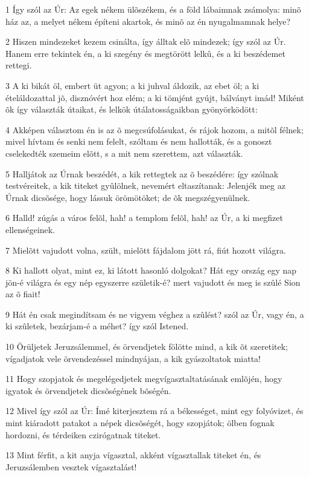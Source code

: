 \par 1 Így szól az Úr: Az egek nékem ülõszékem, és a föld lábaimnak zsámolya: minõ ház az, a melyet nékem építeni akartok, és minõ az én nyugalmamnak helye?
\par 2 Hiszen mindezeket kezem csinálta, így álltak elõ mindezek; így szól az Úr. Hanem erre tekintek én, a ki szegény és megtörött lelkû, és a ki beszédemet rettegi.
\par 3 A ki bikát öl, embert üt agyon; a ki juhval áldozik, az ebet öl; a ki ételáldozattal jõ, disznóvért hoz elém; a ki tömjént gyújt, bálványt imád! Miként õk így választák útaikat, és lelkök útálatosságaikban gyönyörködött:
\par 4 Akképen választom én is az õ megcsúfolásukat, és rájok hozom, a mitõl félnek; mivel hívtam és senki nem felelt, szóltam és nem hallották, és a gonoszt cselekedték szemeim elõtt, s a mit nem szerettem, azt választák.
\par 5 Halljátok az Úrnak beszédét, a kik rettegtek az õ beszédére: így szólnak testvéreitek, a kik titeket gyûlölnek, nevemért eltaszítanak: Jelenjék meg az Úrnak dicsõsége, hogy lássuk örömötöket; de õk megszégyenülnek.
\par 6 Halld! zúgás a város felõl, hah! a templom felõl, hah! az Úr, a ki megfizet ellenségeinek.
\par 7 Mielõtt vajudott volna, szült, mielõtt fájdalom jött rá, fiút hozott világra.
\par 8 Ki hallott olyat, mint ez, ki látott hasonló dolgokat? Hát egy ország egy nap jön-é világra és egy nép egyszerre születik-é? mert vajudott és meg is szûlé Sion az õ fiait!
\par 9 Hát én csak megindítsam és ne vigyem véghez a szûlést? szól az Úr, vagy én, a ki szûletek, bezárjam-é a méhet? így szól Istened.
\par 10 Örüljetek Jeruzsálemmel, és örvendjetek fölötte mind, a kik õt szeretitek; vígadjatok vele örvendezéssel mindnyájan, a kik gyászoltatok miatta!
\par 11 Hogy szopjatok és megelégedjetek megvígasztaltatásának emlõjén, hogy igyatok és örvendjetek dicsõségének bõségén.
\par 12 Mivel így szól az Úr: Ímé kiterjesztem rá a békességet, mint egy folyóvizet, és mint kiáradott patakot a népek dicsõségét, hogy szopjátok; ölben fognak hordozni, és térdeiken czirógatnak titeket.
\par 13 Mint férfit, a kit anyja vígasztal, akként vígasztallak titeket én, és Jeruzsálemben vesztek vígasztalást!
